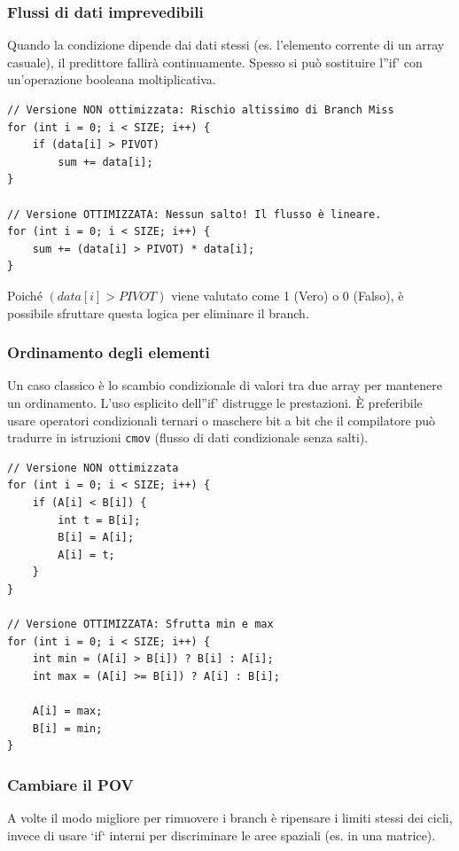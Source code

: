 \subsubsection*{Flussi di dati imprevedibili}
Quando la condizione dipende dai dati stessi (es. l'elemento corrente di un array casuale), il predittore fallirà continuamente. Spesso si può sostituire l''if' con un'operazione booleana moltiplicativa.
\begin{framed}
\footnotesize    
\begin{verbatim}
// Versione NON ottimizzata: Rischio altissimo di Branch Miss
for (int i = 0; i < SIZE; i++) {
    if (data[i] > PIVOT) 
        sum += data[i];
}

// Versione OTTIMIZZATA: Nessun salto! Il flusso è lineare.
for (int i = 0; i < SIZE; i++) {
    sum += (data[i] > PIVOT) * data[i];
}
\end{verbatim}
\end{framed}
Poiché $(data[i] > PIVOT)$ viene valutato come 1 (Vero) o 0 (Falso), è possibile sfruttare questa logica per eliminare il branch.
\subsubsection*{Ordinamento degli elementi}
Un caso classico è lo scambio condizionale di valori tra due array per mantenere un ordinamento. L'uso esplicito dell''if' distrugge le prestazioni. È preferibile usare operatori condizionali ternari o maschere bit a bit che il compilatore può tradurre in istruzioni \texttt{cmov} (flusso di dati condizionale senza salti).
\begin{framed}
\footnotesize

\begin{verbatim}
// Versione NON ottimizzata
for (int i = 0; i < SIZE; i++) {
    if (A[i] < B[i]) {
        int t = B[i];
        B[i] = A[i];
        A[i] = t;
    }
}

// Versione OTTIMIZZATA: Sfrutta min e max
for (int i = 0; i < SIZE; i++) {
    int min = (A[i] > B[i]) ? B[i] : A[i];
    int max = (A[i] >= B[i]) ? A[i] : B[i];
    
    A[i] = max;
    B[i] = min;
}
\end{verbatim}
\end{framed}
\subsubsection*{Cambiare il POV}
A volte il modo migliore per rimuovere i branch è ripensare i limiti stessi dei cicli, invece di usare `if` interni per discriminare le aree spaziali (es. in una matrice). 

